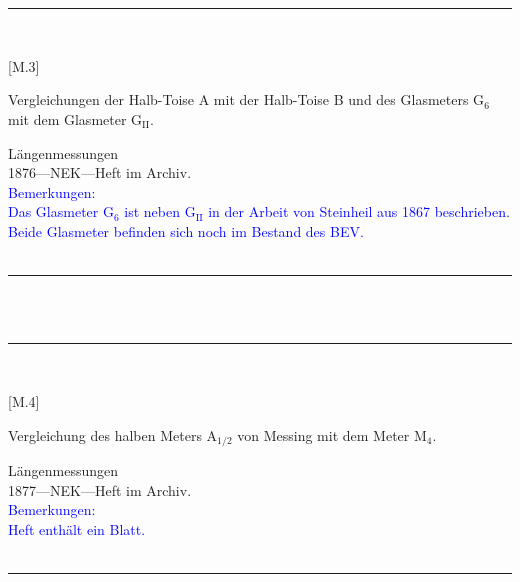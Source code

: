 \\
\vspace*{-2.5pt}\\
\parbox{\textwidth}{%
\rule{\textwidth}{1pt}\vspace*{-3mm}\\
\begin{minipage}[t]{0.2\textwidth}\vspace{0pt}
\Huge\rule[-4mm]{0cm}{1cm}[M.3]
\end{minipage}
\hfill
\begin{minipage}[t]{0.8\textwidth}\vspace{0pt}
\large Vergleichungen der Halb-Toise {\glqq}A{\grqq} mit der Halb-Toise {\glqq}B{\grqq} und des Glasmeters {\glqq}G$_\mathrm{6}${\grqq} mit dem Glasmeter {\glqq}G$_\mathrm{II}${\grqq}.\rule[-2mm]{0mm}{2mm}
\end{minipage}
{\footnotesize\flushright
Längenmessungen\\
}
1876\quad---\quad NEK\quad---\quad Heft im Archiv.\\
\textcolor{blue}{Bemerkungen:\\{}
Das Glasmeter G$_\mathrm{6}$ ist neben G$_\mathrm{II}$ in der Arbeit von Steinheil aus 1867 beschrieben.\\{}
Beide Glasmeter befinden sich noch im Bestand des BEV.\\{}
}
\\[-15pt]
\rule{\textwidth}{1pt}
}
\\
\vspace*{-2.5pt}\\
\parbox{\textwidth}{%
\rule{\textwidth}{1pt}\vspace*{-3mm}\\
\begin{minipage}[t]{0.2\textwidth}\vspace{0pt}
\Huge\rule[-4mm]{0cm}{1cm}[M.4]
\end{minipage}
\hfill
\begin{minipage}[t]{0.8\textwidth}\vspace{0pt}
\large Vergleichung des halben Meters {\glqq}A$_\mathrm{1/2}${\grqq} von Messing mit dem Meter {\glqq}M$_\mathrm{4}${\grqq}.\rule[-2mm]{0mm}{2mm}
\end{minipage}
{\footnotesize\flushright
Längenmessungen\\
}
1877\quad---\quad NEK\quad---\quad Heft im Archiv.\\
\textcolor{blue}{Bemerkungen:\\{}
Heft enthält ein Blatt.\\{}
}
\\[-15pt]
\rule{\textwidth}{1pt}
}
